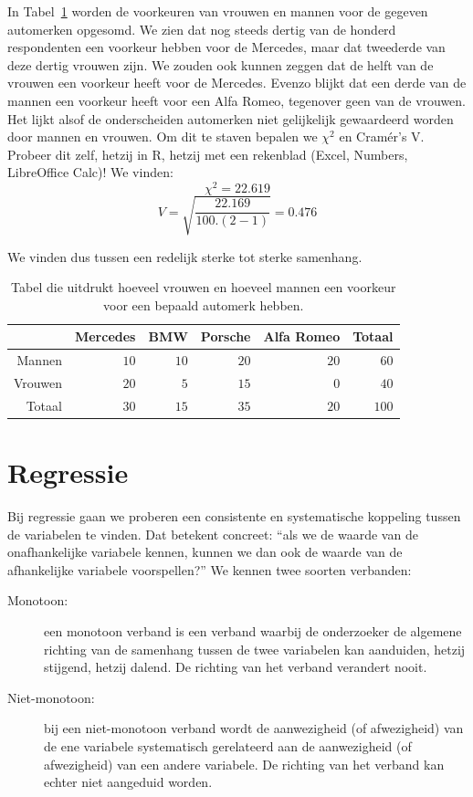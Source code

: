 

\begin{example}
  In Tabel~\ref{tab:autovoorkeur} worden de voorkeuren van vrouwen en mannen voor de gegeven automerken opgesomd. We zien dat nog steeds dertig van de honderd respondenten een voorkeur hebben voor de Mercedes, maar dat tweederde van deze dertig vrouwen zijn. We zouden  ook kunnen zeggen dat de helft van de vrouwen een voorkeur heeft voor de Mercedes. Evenzo blijkt dat een derde van de mannen een voorkeur heeft voor een Alfa Romeo, tegenover geen van de vrouwen. Het lijkt alsof de onderscheiden automerken niet gelijkelijk gewaardeerd worden door mannen en vrouwen. Om dit te staven bepalen we $\chi^{2}$ en Cramér's V. Probeer dit zelf, hetzij in R, hetzij met een rekenblad (Excel, Numbers, LibreOffice Calc)! We vinden:
  \[ \chi^{2} = 22.619 \]
  \[ V = \sqrt{\frac{22.169}{100 . (2-1)}}  = 0.476\]

  We vinden dus tussen een redelijk sterke tot sterke samenhang.
\end{example}

\begin{table} \centering
  \begin{tabular}{@{}rrrrrr@{}}
  	\toprule
  	        & Mercedes &  BMW & Porsche & Alfa Romeo & Totaal \\ \midrule
  	 Mannen &     $10$ & $10$ &    $20$ &       $20$ &   $60$ \\
  	Vrouwen &     $20$ &  $5$ &    $15$ &        $0$ &   $40$ \\
  	 Totaal &     $30$ & $15$ &    $35$ &       $20$ &  $100$ \\ \bottomrule
  \end{tabular}
  \caption{Tabel die uitdrukt hoeveel vrouwen en hoeveel mannen een voorkeur voor een bepaald automerk hebben.}
  \label{tab:autovoorkeur}
\end{table}

\section{Regressie}
\label{sec:regressie}

Bij  regressie gaan we proberen een consistente en systematische koppeling tussen de variabelen te vinden. Dat betekent concreet: ``als we de waarde van de onafhankelijke variabele kennen, kunnen we dan ook de waarde van de afhankelijke variabele voorspellen?'' We kennen twee soorten verbanden:
\begin{description}
  \item [Monotoon:] een monotoon verband is een verband waarbij de onderzoeker de algemene richting van de samenhang tussen de twee variabelen kan aanduiden, hetzij stijgend, hetzij dalend. De richting van het verband verandert nooit.
  \item [Niet-monotoon:] bij een niet-monotoon verband wordt de aanwezigheid (of afwezigheid) van de ene variabele systematisch gerelateerd aan de aanwezigheid (of afwezigheid) van een andere variabele. De richting van het verband kan echter niet aangeduid worden.
\end{description}

